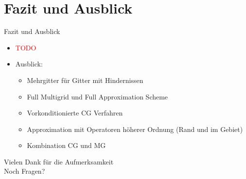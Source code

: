 \documentclass[aspectratio=169]{beamer}
\theoremstyle{thm}
\begin{document}
\section{Fazit und Ausblick}\label{sec:Fazit}
\begin{frame}{Fazit und Ausblick}
  \begin{itemize}[<+(1)->]
    \item \textcolor{red}{\huge TODO}
    \item Ausblick:
      \begin{itemize}
        \item Mehrgitter für Gitter mit Hindernissen
        \item Full Multigrid und Full Approximation Scheme
        \item Vorkonditionierte CG Verfahren
        \item Approximation mit Operatoren höherer Ordnung (Rand und im Gebiet)
        \item Kombination CG und MG
      \end{itemize}
  \end{itemize}
\end{frame}

\begin{frame}[plain]
  \begin{center}
    \Large \textcolor{simtechred}{ Vielen Dank für die Aufmerksamkeit } \\[2em]
    \normalsize Noch Fragen?
  \end{center}
\end{frame}
\end{document}
